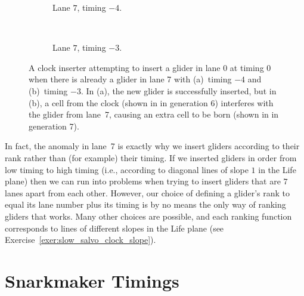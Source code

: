 \begin{figure}[!htb]
	\centering
	\begin{subfigure}{.43\textwidth}
		\centering{}
		\caption{Lane $7$, timing $-4$.}\label{fig:clock_inserter_7_lanes_ok}
	\end{subfigure} \ \ \ \ %
	\begin{subfigure}{.53\textwidth}
		\centering{}
		\caption{Lane $7$, timing $-3$.}\label{fig:clock_inserter_7_lanes_bad}
	\end{subfigure}
	\caption{A clock inserter attempting to insert a glider in lane $0$ at timing $0$ when there is already a glider in lane 7 with (a)~timing $-4$ and (b)~timing $-3$. In (a), the new glider is successfully inserted, but in (b), a cell from the clock (shown in  in generation 6) interferes with the glider from lane~7, causing an extra cell to be born (shown in  in generation 7).}\label{fig:clock_inserter_7_lanes}
\end{figure}

In fact, the anomaly in lane~7 is exactly why we insert gliders according to their rank rather than (for example) their timing. If we inserted gliders in order from low timing to high timing (i.e., according to diagonal lines of slope $1$ in the Life plane) then we can run into problems when trying to insert gliders that are $7$ lanes apart from each other. However, our choice of defining a glider's rank to equal its lane number plus its timing is by no means the only way of ranking gliders that works. Many other choices are possible, and each ranking function corresponds to lines of different slopes in the Life plane (see Exercise~\ref{exer:slow_salvo_clock_slope}).


\renewcommand{\chapterfolder}{universal_construction/}
\section{Snarkmaker Timings}\label{sec:appendix_snarkmaker}

